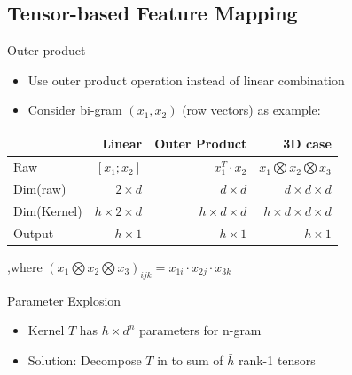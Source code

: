 \documentclass[compress]{beamer}
\begin{document}
    \subsection{Tensor-based Feature Mapping}
        \begin{frame}[allowframebreaks]{\subsecname}
            \begin{block}{Outer product}
                \begin{itemize}
                    \item Use outer product operation instead of linear combination
                    \item Consider bi-gram $(x_1, x_2)$ (row vectors) as example:
                \end{itemize}
                \begin{table}[t]
                    \centering
                    \begin{tabular}{lrrr}
                                & Linear             & Outer Product        & 3D case                             \\ \hline
                    Raw         & $[x_1; x_2]$       & $x_1^T \cdot x_2$    & $x_1 \bigotimes x_2 \bigotimes x_3$ \\ \hline
                    Dim(raw)    & $2\times d$        & $d\times d$          & $d\times d \times d$                \\ \hline
                    Dim(Kernel) & $h\times2\times d$ & $h\times d \times d$ & $h\times d \times d \times d$       \\ \hline
                    Output      & $h\times 1$        & $h \times 1$         & $h \times 1$
                    \end{tabular}
                \end{table}
                ,where $(x_1 \bigotimes x_2 \bigotimes x_3)_{ijk} = x_{1i} \cdot x_{2j} \cdot x_{3k}$
            \end{block}
        \framebreak
            \begin{block}{Parameter Explosion}
                \begin{itemize}
                    \item Kernel $T$ has $h\times d^n$ parameters for n-gram
                    \item Solution: Decompose $T$ in to sum of $\bar{h}$ rank-1 tensors
                    \begin{table}[t]
                    \centering
                    \begin{tabular}{lll}

\end{tabular}
\end{table}
\end{itemize}
\end{block}
\end{frame}
\end{document}
